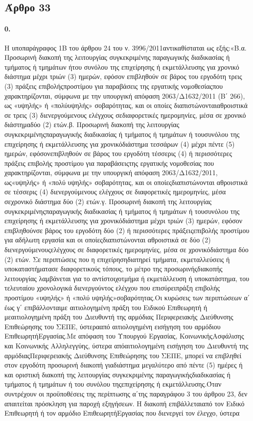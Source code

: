 \documentclass[a4paper,oneside, 10pt]{book}
\begin{document}
\subsection*{ Άρθρο 33 }
\paragraph { 0. } Η υποπαράγραφος 1Β του άρθρου 24 του ν. 3996/2011αντικαθίσταται ως εξής:«Β.α. Προσωρινή διακοπή της λειτουργίας συγκεκριμένης παραγωγικής διαδικασίας ή τμήματος ή τμημάτων ήτου συνόλου της επιχείρησης ή εκμετάλλευσης για χρονικό διάστημα μέχρι τριών (3) ημερών, εφόσον επιβληθούν σε βάρος του εργοδότη τρεις (3) πράξεις επιβολήςπροστίμου για παραβάσεις της εργατικής νομοθεσίαςπου χαρακτηρίζονται, σύμφωνα με την υπουργική απόφαση 2063/Δ1632/2011 (Β΄ 266), ως «υψηλής» ή «πολύυψηλής» σοβαρότητας, και οι οποίες διαπιστώνονταιαθροιστικά σε τρεις (3) διενεργούμενους ελέγχους σεδιαφορετικές ημερομηνίες, μέσα σε χρονικό διάστημαδύο (2) ετών.β. Προσωρινή διακοπή της λειτουργίας συγκεκριμένηςπαραγωγικής διαδικασίας ή τμήματος ή τμημάτων ή τουσυνόλου της επιχείρησης ή εκμετάλλευσης για χρονικόδιάστημα τεσσάρων (4) μέχρι πέντε (5) ημερών, εφόσονεπιβληθούν σε βάρος του εργοδότη τέσσερις (4) ή περισσότερες πράξεις επιβολής προστίμου για παραβάσειςτης εργατικής νομοθεσίας που χαρακτηρίζονται, σύμφωνα με την υπουργική απόφαση 2063/Δ1632/2011, ως«υψηλής» ή «πολύ υψηλής» σοβαρότητας, και οι οποίεςδιαπιστώνονται αθροιστικά σε τέσσερις (4) διενεργούμενους ελέγχους σε διαφορετικές ημερομηνίες, μέσα σεχρονικό διάστημα δύο (2) ετών.γ. Προσωρινή διακοπή της λειτουργίας συγκεκριμένηςπαραγωγικής διαδικασίας ή τμήματος ή τμημάτων ή τουσυνόλου της επιχείρησης ή εκμετάλλευσης για χρονικόδιάστημα μέχρι τριών (3) ημερών, εφόσον επιβληθούνσε βάρος του εργοδότη δύο (2) ή περισσότερες πράξειςεπιβολής προστίμου για αδήλωτη εργασία και οι οποίεςδιαπιστώνονται αθροιστικά σε δύο (2) διενεργούμενουςελέγχους σε διαφορετικές ημερομηνίες, μέσα σε χρονικόδιάστημα δύο (2) ετών. Σε περιπτώσεις που η επιχείρησηδιατηρεί τμήματα, εκμεταλλεύσεις ή υποκαταστήματασε διαφορετικούς τόπους, το μέτρο της προσωρινήςδιακοπής λειτουργίας λαμβάνεται για το αντίστοιχοτμήμα ή εκμετάλλευση ή υποκατάστημα, του τελευταίου χρονολογικά διενεργούντος ελέγχου που επισύρειπράξη επιβολής προστίμου «υψηλής» ή «πολύ υψηλής»σοβαρότητας.Οι κυρώσεις των περιπτώσεων α΄ έως γ΄ επιβάλλονταιμε αιτιολογημένη πράξη του Ειδικού Επιθεωρητή ή μεαιτιολογημένη πράξη του Διευθυντή της αρμόδιας Περιφερειακής Διεύθυνσης Επιθεώρησης του ΣΕΠΕ, ύστερααπό αιτιολογημένη εισήγηση του αρμόδιου ΕπιθεωρητήΕργασίας.Με απόφαση του Υπουργού Εργασίας, ΚοινωνικήςΑσφάλισης και Κοινωνικής Αλληλεγγύης, ύστερα απόαιτιολογημένη εισήγηση του Διευθυντή της αρμόδιαςΠεριφερειακής Διεύθυνσης Επιθεώρησης του ΣΕΠΕ, μπορεί να επιβληθεί στον εργοδότη προσωρινή διακοπή γιαδιάστημα μεγαλύτερο από πέντε (5) ημέρες ή και οριστική διακοπή της λειτουργίας συγκεκριμένης παραγωγικήςδιαδικασίας ή τμήματος ή τμημάτων ή του συνόλου τηςεπιχείρησης ή εκμετάλλευσης.Όταν συντρέχουν οι προϋποθέσεις της περίπτωσης α΄της παραγράφου 3 του άρθρου 23, δεν απαιτείται πρόσκληση για παροχή εξηγήσεων. Η διακοπή επιβάλλεταιαπό τον Ειδικό Επιθεωρητή ή τον αρμόδιο ΕπιθεωρητήΕργασίας που διενεργεί τον έλεγχο, ύστερα 
\end{document}
